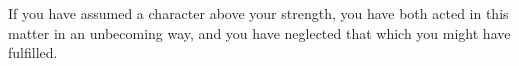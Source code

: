 If you  have assumed a  character above your strength,  you have both  acted in
this matter in an  unbecoming way, and you have neglected  that which you might
have fulfilled.

